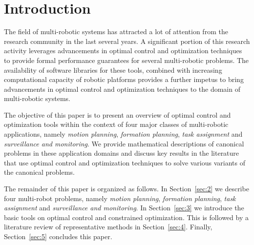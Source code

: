 
\section{Introduction}\label{sec:1}
The field of multi-robotic systems has attracted a lot of attention from the research community in the last several years. A significant portion of this research activity leverages advancements in optimal control and optimization techniques to provide formal performance guarantees for several multi-robotic problems. The availability of software libraries for these tools, combined with increasing computational capacity of robotic platforms provides a further impetus to bring advancements in optimal control and optimization techniques to the domain of multi-robotic systems. 


The objective of this paper is to present an overview of optimal control and optimization tools within the context of four major classes of multi-robotic applications, namely \emph{motion planning}, \emph{formation planning}, \emph{task assignment} and \emph{surveillance and monitoring}. We provide mathematical descriptions of canonical problems in these application domains and discuss key results in the literature that use optimal control and optimization techniques to solve various variants of the canonical problems.  

%

The remainder of this paper is organized as follows. In Section~\ref{sec:2} we describe four multi-robot problems, namely \emph{motion planning}, \emph{formation planning}, \emph{task assignment} and \emph{surveillance and monitoring}. In Section~\ref{sec:3} we introduce the basic tools on optimal control and constrained optimization. This is followed by a literature review of representative methods in Section~\ref{sec:4}. Finally, Section~\ref{sec:5} concludes this paper.